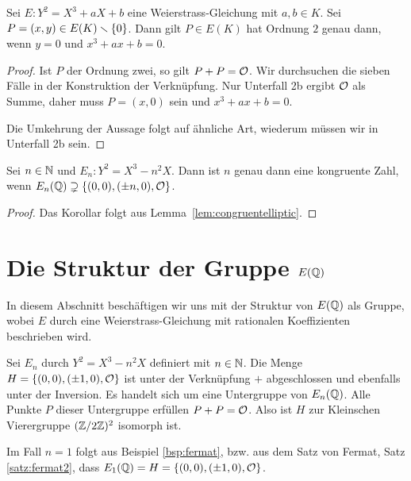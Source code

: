 \begin{lemma}
  \label{lem:2torsion}
  Sei $E:Y^2 = X^3+aX+b$ eine Weierstrass-Gleichung mit $a,b\in K$.
  Sei $P=(x,y)\in E(K)\smallsetminus\{0\}$. Dann gilt
   $P\in E(K)$ hat Ordnung $2$ genau dann, wenn $y=0$ und $x^3+ax+b=0$.
\end{lemma}
\begin{proof}
  Ist $P$ der Ordnung zwei, so gilt $P+P={\mathcal O}$.
  Wir durchsuchen die sieben Fälle in der Konstruktion der
  Verknüpfung. Nur Unterfall 2b ergibt ${\mathcal O}$ als Summe, daher muss
  $P=(x,0)$ sein und $x^3+ax+b=0$.

  Die Umkehrung der Aussage folgt auf ähnliche Art, wiederum müssen
  wir in Unterfall 2b sein.
\end{proof}

\begin{korollar}
  \label{kor:congruentelliptic}
  Sei $n\in{\mathbb{N}}$ und $E_n : Y^2 = X^3-n^2 X$. Dann ist
  $n$ genau dann eine kongruente Zahl, wenn $E_n({\mathbb{Q}}) \supsetneq
  \{(0,0),(\pm n,0),{\mathcal O}\}$. 
\end{korollar}
\begin{proof}
  Das Korollar folgt aus Lemma~\ref{lem:congruentelliptic}. 
\end{proof}

\section{Die Struktur der Gruppe $E({\mathbb{Q}})$}

In diesem Abschnitt beschäftigen wir uns mit der 
Struktur von $E({\mathbb{Q}})$ als Gruppe, wobei $E$ durch eine Weierstrass-Gleichung mit
rationalen Koeffizienten beschrieben wird. 


\begin{beispiel}
  \label{bsp:vierergruppe}
  Sei $E_n$ durch $Y^2 = X^3-n^2 X$ definiert mit $n\in{\mathbb{N}}$.
  Die Menge $H=\{(0,0),(\pm 1,0),{\mathcal O}\}$ ist unter der Verknüpfung $+$
  abgeschlossen
  und ebenfalls unter der Inversion.
  Es handelt sich um eine Untergruppe von $E_n({\mathbb{Q}})$.
  Alle
  Punkte $P$ dieser Untergruppe erfüllen $P+P={\mathcal O}$.  Also ist $H$ zur
  Kleinschen Vierergruppe $({\mathbb{Z}}/2{\mathbb{Z}})^2$ isomorph ist.
  
  Im Fall $n=1$ folgt aus Beispiel \ref{bsp:fermat}, bzw. aus dem Satz von Fermat, Satz
  \ref{satz:fermat2}, dass $E_1({\mathbb{Q}}) = H=  \{(0,0),(\pm 1,0),{\mathcal O}\}$. 
\end{beispiel}

